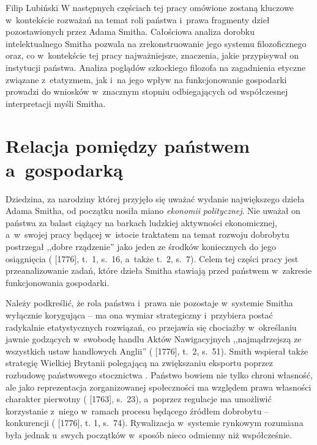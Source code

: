 \begin{artplenv}{Filip Lubiński}
W następnych częściach tej pracy omówione zostaną kluczowe w~kontekście rozważań na temat roli państwa i~prawa
fragmenty dzieł pozostawionych przez Adama Smitha. Całościowa analiza dorobku intelektualnego Smitha pozwala na
zrekonstruowanie jego systemu filozoficznego oraz, co w~kontekście tej pracy najważniejsze, znaczenia, jakie przypisywał
on instytucji państwa. Analiza poglądów szkockiego filozofa na zagadnienia etyczne związane z~etatyzmem, jak i~na jego
wpływ na funkcjonowanie gospodarki prowadzi do wniosków w~znacznym stopniu odbiegających od współczesnej interpretacji
myśli Smitha.

\section{Relacja pomiędzy państwem a~gospodarką}
Dziedzina, za narodziny której przyjęło się uważać wydanie największego dzieła Adama Smitha, od początku nosiła miano
\textit{ekonomii} \textit{politycznej}. Nie uważał on państwa za balast ciążący na barkach ludzkiej aktywności
ekonomicznej, a~w~swojej pracy będącej w~istocie traktatem na temat rozwoju dobrobytu postrzegał ,,dobre rządzenie'' jako
jeden ze środków koniecznych do jego osiągnięcia
(\cite{smith_badania_2007} [1776], t.~1, s.~16, a~także t.~2, s.~7).
Celem tej części pracy jest przeanalizowanie zadań, które dzieła Smitha stawiają przed państwem w~zakresie
funkcjonowania gospodarki.

Należy podkreślić, że rola państwa i~prawa nie pozostaje w~systemie Smitha wyłącznie korygująca -- ma ona wymiar
strategiczny i~przybiera postać radykalnie etatystycznych rozwiązań, co przejawia się chociażby w~określaniu jawnie
godzących w~swobodę handlu Aktów Nawigacyjnych ,,najmądrzejszą ze wszystkich ustaw handlowych Anglii''
(\cite{smith_badania_2007} [1776], t.~2, s.~51).
Smith wspierał także strategię Wielkiej Brytanii polegającą
na zwiększaniu eksportu poprzez rozbudowę państwowego stocznictwa
\parencite[s.~185–186]{beattie_false_2010}.
Państwo bowiem nie tylko chroni własność, ale jako reprezentacja zorganizowanej społeczności ma względem prawa
własności charakter pierwotny
(\cite{smith_lectures_1982} [1763], s.~23),
a~poprzez regulacje ma umożliwić
korzystanie z~niego w~ramach procesu będącego źródłem dobrobytu -- konkurencji
(\cite{smith_badania_2007} [1776], t. 1, s.~74).
Rywalizacja w~systemie rynkowym rozumiana była jednak u~swych początków w~sposób nieco odmienny
niż współcześnie.


\end{artplenv}
